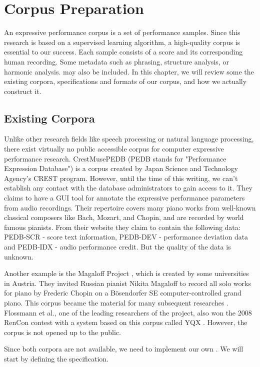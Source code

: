 \chapter{Corpus Preparation}
\label{chap:corpus}
  An expressive performance corpus is a set of performance samples. Since this research is based on a supervised learning algorithm, a high-quality corpus is essential to our success. Each sample consists of a score and its corresponding human recording. Some metadata such as phrasing, structure analysis, or harmonic analysis. may also be included. In this chapter, we will review some the existing corpora, specifications and formats of our corpus, and how we actually construct it.

\section{Existing Corpora} 
Unlike other research fields like speech processing or natural language processing, there exist virtually no public accessible corpus for computer expressive performance research. CrestMusePEDB \cite{crestmuse} (PEDB stands for "Performance Expression Database") is a corpus created by Japan Science and Technology Agency's CREST program. However, until the time of this writing, we can't establish any contact with the database administrators to gain access to it. They claims to have a GUI tool for annotate the expressive performance parameters from audio recordings. Their repertoire covers many piano works from well-known classical composers like Bach, Mozart, and Chopin, and are recorded by world famous pianists. From their website \cite{crestmuse} they claim to contain the following data: PEDB-SCR - score text information, PEDB-DEV - performance deviation data and PEDB-IDX - audio performance credit. But the quality of the data is unknown.

Another example is the Magaloff Project \cite{magaloff}, which is created by some universities in Austria. They invited Russian pianist Nikita Magaloff to record all solo works for piano by Frederic Chopin on a Bösendorfer SE computer-controlled grand piano. This corpus became the material for many subsequent researches \cite{Goebl2009, Grachten2011, Flossmann2009, Grachten2012, Flossmann2013, Flossman2011, Flossmann2010a}. Flossmann et al., one of the leading researchers of the project, also won the 2008 RenCon contest with a system based on this corpus called YQX \cite{yqx}. However, the corpus is not opened up to the public. 

Since both corpora are not available, we need to implement our own . We will start by defining the specification.


